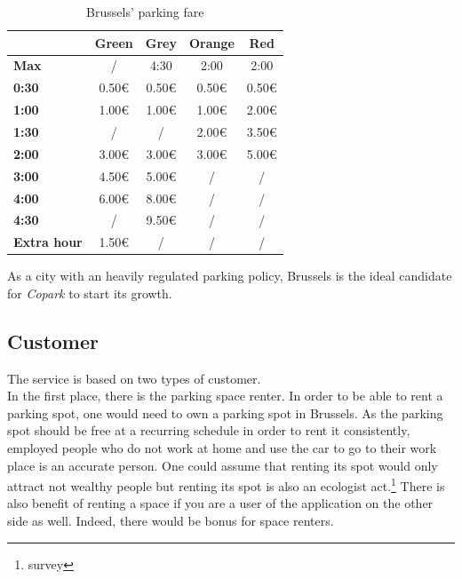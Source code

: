 \documentclass[12pt,a4paper,oneside]{book}
\newcommand{\bp}{\textit{Copark }}
\begin{document}
\begin{table}[h]
\centering
\caption{Brussels' parking fare}
\label{bxfare}
\begin{tabular}{@{}lcccc@{}}
\cmidrule(l){2-5}
\textbf{}                                 & \textbf{Green} & \textbf{Grey} & \textbf{Orange} & \textbf{Red} \\ \midrule
\multicolumn{1}{l}{\textbf{Max}}        & /              & 4:30          & 2:00            & 2:00         \\ \midrule
\multicolumn{1}{l}{\textbf{0:30}}       & 0.50\euro{}           & 0.50\euro{}          & 0.50\euro{}            & 0.50\euro{}         \\ \midrule
\multicolumn{1}{l}{\textbf{1:00}}       & 1.00\euro{}           & 1.00\euro{}          & 1.00\euro{}            & 2.00\euro{}         \\ \midrule
\multicolumn{1}{l}{\textbf{1:30}}       & /              & /             & 2.00\euro{}            & 3.50\euro{}         \\ \midrule
\multicolumn{1}{l}{\textbf{2:00}}       & 3.00\euro{}           & 3.00\euro{}          & 3.00\euro{}            & 5.00\euro{}         \\ \midrule
\multicolumn{1}{l}{\textbf{3:00}}       & 4.50\euro{}           & 5.00\euro{}          & /               & /            \\ \midrule
\multicolumn{1}{l}{\textbf{4:00}}       & 6.00\euro{}           & 8.00\euro{}          & /               & /            \\ \midrule
\multicolumn{1}{l}{\textbf{4:30}}       & /              & 9.50\euro{}          & /               & /            \\ \midrule
\multicolumn{1}{l}{\textbf{Extra hour}} & 1.50\euro{}           & /             & /               & /            \\ \bottomrule
\end{tabular}
\end{table}

As a city with an heavily regulated parking policy, Brussels is the ideal candidate for \bp to start its growth.

\subsection{Customer}
The service is based on two types of customer.\\

In the first place, there is the parking space renter. In order to be able to rent a parking spot, one would need to own a parking spot in Brussels. As the parking spot should be free at a recurring schedule in order to rent it consistently, employed people who do not work at home and use the car to go to their work place is an accurate person. One could assume that renting its spot would only attract not wealthy people but renting its spot is also an ecologist act.\footnote{survey} There is also benefit of renting a space if you are a user of the application on the other side as well. Indeed, there would be bonus for space renters.\\
\end{document}
